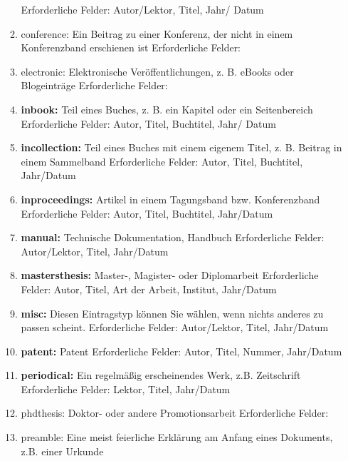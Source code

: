 \documentclass[a4paper,11pt,twoside]{scrbook}
\begin{document}
\begin{enumerate}
\begin{enumerate}
        Erforderliche Felder: Autor/Lektor, Titel, Jahr/ Datum
        \item conference: Ein Beitrag zu einer Konferenz, der nicht in einem Konferenzband erschienen ist\newline
        Erforderliche Felder:
        \item electronic: Elektronische Veröffentlichungen, z. B. eBooks oder Blogeinträge\newline 
        Erforderliche Felder:
        \item \textbf{inbook:} Teil eines Buches, z. B. ein Kapitel oder ein Seitenbereich\newline
        Erforderliche Felder: Autor, Titel, Buchtitel, Jahr/ Datum 
        \item \textbf{incollection:} Teil eines Buches mit einem eigenem Titel, z. B. Beitrag in einem Sammelband\newline
        Erforderliche Felder: Autor, Titel, Buchtitel, Jahr/Datum
        \item \textbf{inproceedings:} Artikel in einem Tagungsband bzw. Konferenzband\newline
        Erforderliche Felder: Autor, Titel, Buchtitel, Jahr/Datum
        \item \textbf{manual:} Technische Dokumentation, Handbuch\newline
        Erforderliche Felder: Autor/Lektor, Titel, Jahr/Datum
        \item \textbf{mastersthesis:} Master-, Magister- oder Diplomarbeit\newline
        Erforderliche Felder: Autor, Titel, Art der Arbeit, Institut, Jahr/Datum
        \item \textbf{misc:} Diesen Eintragstyp können Sie wählen, wenn nichts anderes zu passen scheint. \newline
        Erforderliche Felder: Autor/Lektor, Titel, Jahr/Datum
        \item \textbf{patent:} Patent\newline 
        Erforderliche Felder: Autor, Titel, Nummer, Jahr/Datum
        \item \textbf{periodical:} Ein regelmäßig erscheinendes Werk, z.B. Zeitschrift\newline
        Erforderliche Felder: Lektor, Titel, Jahr/Datum
        \item phdthesis: Doktor- oder andere Promotionsarbeit\newline 
        Erforderliche Felder:
        \item preamble: Eine meist feierliche Erklärung am Anfang eines Dokuments, z.B. einer Urkunde\newline 

\end{enumerate}
\end{enumerate}
\end{document}
